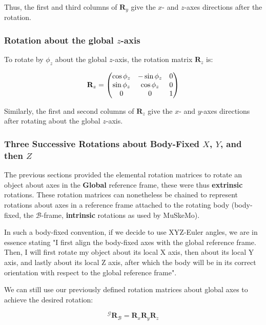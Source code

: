 \documentclass{article}
\begin{document}
Thus, the first and third columns of \( \mathbf{R}_y \) give the \( x \)- and \( z \)-axes directions after the rotation.

\subsubsection*{Rotation about the global \( z \)-axis}

To rotate by \( \phi_z \) about the global \( z \)-axis, the rotation matrix \( \mathbf{R}_z \) is:

\begin{equation}
\mathbf{R}_z = \mqty(
\cos \phi_z & -\sin \phi_z & 0 \\
\sin \phi_z & \cos \phi_z & 0 \\
0 & 0 & 1
)
\label{eq:Rz}
\end{equation}

Similarly, the first and second columns of \( \mathbf{R}_z \) give the \( x \)- and \( y \)-axes directions after rotating about the global \( z \)-axis.


\subsubsection*{Three Successive Rotations about Body-Fixed \(X\), \(Y\), and then \(Z\)}

The previous sections provided the elemental rotation matrices to rotate an object about axes in the \textbf{Global} reference frame, these were thus \textbf{extrinsic} rotations. These rotation matrices can nonetheless be chained to represent rotations about axes in a reference frame attached to the rotating body (body-fixed, the \( \mathcal{B} \)-frame, \textbf{intrinsic} rotations as used by MuSkeMo).

In such a body-fixed convention, if we decide to use XYZ-Euler angles, we are in essence stating "I first align the body-fixed axes with the global reference frame. Then, I will first rotate my object about its local X axis, then about its local Y axis, and lastly about its local Z axis, after which the body will be in its correct orientation with respect to the global reference frame".

We can still use our previously defined rotation matrices about global axes to achieve the desired rotation:

\begin{equation}
{}^{\mathcal{G}} \mathbf{R}_{\mathcal{B}} = \mathbf{R}_x \mathbf{R}_y \mathbf{R}_z
\label{eq:xyz_global_successive}
\end{equation}
\end{document}
